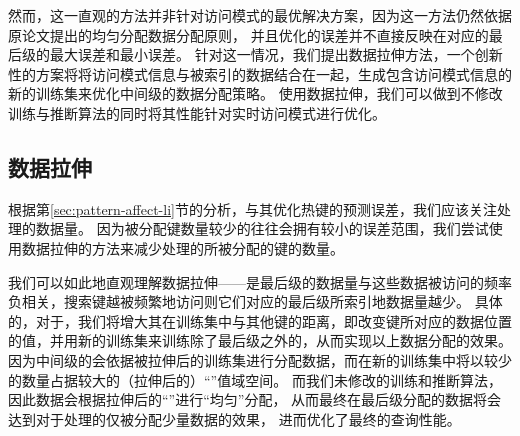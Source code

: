 
然而，这一直观的方法并非针对访问模式的最优解决方案，因为这一方法仍然依据原论文提出的均匀分配数据分配原则，
并且优化{\hotkey}的误差并不直接反映在对应的{\rmi}最后级{\model}的最大误差和最小误差。
针对这一情况，我们提出数据拉伸方法，一个创新性的方案将将访问模式信息与被索引的数据结合在一起，生成包含访问模式信息的新的训练集来优化{\rmi}中间级的数据分配策略。
使用数据拉伸，我们可以做到不修改{\rmi}训练与推断算法的同时将其性能针对实时访问模式进行优化。

\subsection{数据拉伸}

根据第\ref{sec:pattern-affect-li}节的分析，与其优化热键的预测误差，我们应该关注处理{\hotkey}{\model}的数据量。
因为被分配键数量较少的{\model}往往会拥有较小的误差范围，我们尝试使用数据拉伸的方法来减少处理{\hotkey}的{\model}所被分配的键的数量。

我们可以如此地直观理解数据拉伸{------}是{\rmi}最后级{\model}的数据量与这些数据被访问的频率负相关，搜索键越被频繁地访问则它们对应的{\rmi}最后级{\model}所索引地数据量越少。
具体的，对于{\hotkey}，我们将增大其在训练集中与其他键的距离，即改变键所对应的数据位置的值，并用新的训练集来训练除了最后级之外的{\model}，从而实现以上数据分配的效果。
因为中间级的{\model}会依据被拉伸后的训练集进行分配数据，而在新的训练集中{\hotkey}将以较少的数量占据较大的（拉伸后的）“{\cdf}”值域空间。
而我们未修改{\rmi}的训练和推断算法，因此数据会根据拉伸后的“{\cdf}”进行“均匀”分配，
从而最终在最后级分配的数据将会达到对于处理{\hotkey}的{\model}仅被分配少量数据的效果，
进而优化了最终{\hotkey}的查询性能。

